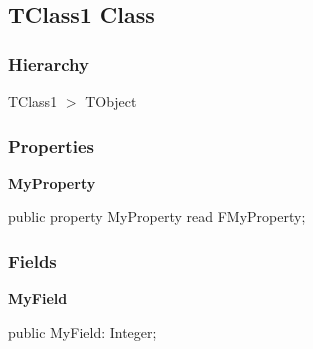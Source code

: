 \documentclass{report}
\newif\ifpdf
\begin{document}
\subsection*{TClass1 Class}
\fi
\label{ok_nodescription_printing.TClass1}
\subsubsection*{\large{\textbf{Hierarchy}}\normalsize\hspace{1ex}\hfill}
TClass1 {$>$} TObject
\subsubsection*{\large{\textbf{Properties}}\normalsize\hspace{1ex}\hfill}
\begin{list}{}{
\setlength{\itemindent}{0cm}
\setlength{\listparindent}{0cm}
\setlength{\leftmargin}{\evensidemargin}
\addtolength{\leftmargin}{\tmplength}
\settowidth{\labelsep}{X}
\addtolength{\leftmargin}{\labelsep}
\setlength{\labelwidth}{\tmplength}
}
\label{ok_nodescription_printing.TClass1-MyProperty}
\item[\textbf{MyProperty}\hfill]
\ifpdf
\begin{flushleft}
\fi
\begin{ttfamily}
public property MyProperty read FMyProperty;\end{ttfamily}

\ifpdf
\end{flushleft}
\fi


\par  \end{list}
\subsubsection*{\large{\textbf{Fields}}\normalsize\hspace{1ex}\hfill}
\begin{list}{}{
\setlength{\itemindent}{0cm}
\setlength{\listparindent}{0cm}
\setlength{\leftmargin}{\evensidemargin}
\addtolength{\leftmargin}{\tmplength}
\settowidth{\labelsep}{X}
\addtolength{\leftmargin}{\labelsep}
\setlength{\labelwidth}{\tmplength}
}
\label{ok_nodescription_printing.TClass1-MyField}
\item[\textbf{MyField}\hfill]
\ifpdf
\begin{flushleft}
\fi
\begin{ttfamily}
public MyField: Integer;\end{ttfamily}

\ifpdf
\end{flushleft}
\fi


\par  \end{list}
\end{document}
